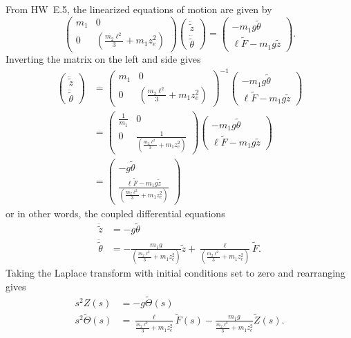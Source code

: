 
From HW~E.5, the linearized equations of motion are given by
\[
\begin{pmatrix}
m_1 & 0 \\ 0 & \left( \frac{m_2 \ell^2}{3} + m_1 z_e^2 \right)
\end{pmatrix} \begin{pmatrix}\ddot{\tilde{z}} \\ \ddot{\tilde{\theta}} \end{pmatrix}
= \begin{pmatrix} -m_1 g \tilde{\theta} \\ \ell \tilde{F} - m_1 g \tilde{z} \end{pmatrix}.
\]
Inverting the matrix on the left and side gives
\begin{align*}
\begin{pmatrix}\ddot{\tilde{z}} \\ \ddot{\tilde{\theta}} \end{pmatrix}
&= \begin{pmatrix}
	m_1 & 0 \\ 0 & \left( \frac{m_2 \ell^2}{3} + m_1 z_e^2 \right)
	\end{pmatrix}^{-1} \begin{pmatrix} -m_1 g \tilde{\theta} \\ \ell \tilde{F} - m_1 g \tilde{z} \end{pmatrix} \\
&= \begin{pmatrix}
	\frac{1}{m_1} & 0 \\ 0 & \frac{1}{\left( \frac{m_2 \ell^2}{3} + m_1 z_e^2 \right)}
	\end{pmatrix} \begin{pmatrix} -m_1 g \tilde{\theta} \\ \ell \tilde{F} - m_1 g \tilde{z} \end{pmatrix} \\
&= \begin{pmatrix} -g \tilde{\theta} \\ \frac{\ell \tilde{F} - m_1 g \tilde{z}}{\left( \frac{m_2 \ell^2}{3} + m_1 z_e^2 \right)} \end{pmatrix} 
\end{align*}
or in other words, the coupled differential equations
\begin{align*}
\ddot{\tilde{z}} &= -g \tilde{\theta} \\ 
\ddot{\tilde{\theta}} &= -\frac{m_1 g}{\left( \frac{m_2 \ell^2}{3} + m_1 z_e^2 \right)}\tilde{z} + \frac{\ell}{\left( \frac{m_2 \ell^2}{3} + m_1 z_e^2 \right)} \tilde{F}.
\end{align*}
Taking the Laplace transform with initial conditions set to zero and rearranging gives
\begin{align}
s^2 Z(s) &= - g \tilde{\Theta}(s) \label{eq:soln_E6_1}\\
s^2 \tilde{\Theta}(s) &= \frac{\ell}{\frac{m_2 \ell^2}{3} + m_1 z_e^2} \tilde{F}(s) - \frac{m_1 g}{\frac{m_2 \ell^2}{3} + m_1 z_e^2} \tilde{Z}(s).
\label{eq:soln_E6_2}
\end{align}


